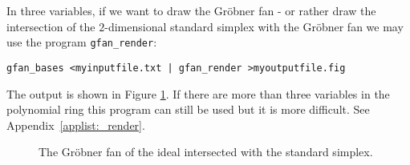In three variables, if we want to draw the Gr\"obner fan - or rather draw the intersection of the $2$-dimensional standard simplex with the Gr\"obner fan we may use the program \texttt{gfan\_render}:
\begin{verbatim}
gfan_bases <myinputfile.txt | gfan_render >myoutputfile.fig
\end{verbatim}
The output is shown in Figure \ref{fig:gfan}.
If there are more than three variables in the polynomial ring this program can still be used but it is more difficult. See Appendix~\ref{applist:_render}.
\begin{figure}
\begin{center}
\end{center}
\caption{The Gr\"obner fan of the ideal intersected with the standard simplex.}
\label{fig:gfan}
\end{figure}

